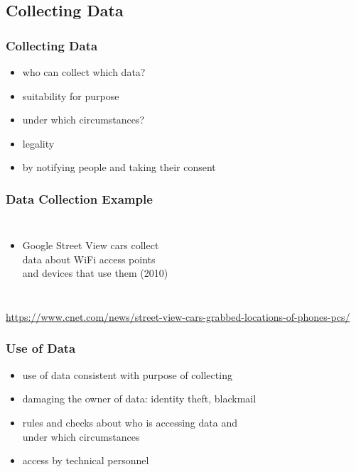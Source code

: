 \documentclass[dvipsnames]{beamer}
\theoremstyle{plain}
\begin{document}
\subsection{Collecting Data}

\begin{frame}
  \frametitle{Collecting Data}

  \begin{itemize}
    \item who can collect which data?
    \item suitability for purpose

    \pause
    \bigskip
    \item under which circumstances?
    \item legality
    \item by notifying people and taking their consent
  \end{itemize}
\end{frame}

\begin{frame}
  \frametitle{Data Collection Example}

  \begin{columns}

    \begin{itemize}
      \item Google Street View cars collect\\
        data about WiFi access points\\
        and devices that use them (2010)
    \end{itemize}
  \end{columns}

  \medskip
  \tiny{\url{https://www.cnet.com/news/street-view-cars-grabbed-locations-of-phones-pcs/}}\\
\end{frame}

\begin{frame}
  \frametitle{Use of Data}

  \begin{itemize}
    \item use of data consistent with purpose of collecting
    \item damaging the owner of data: identity theft, blackmail

    \medskip
    \item rules and checks about who is accessing data and\\
      under which circumstances
    \item access by technical personnel
  \end{itemize}
\end{frame}
\end{document}
